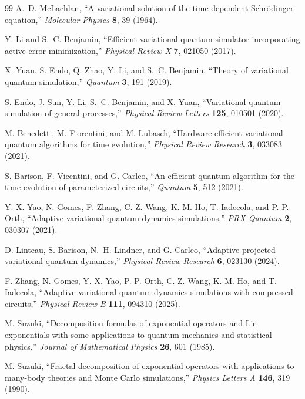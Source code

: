 \documentclass[
  reprint,
  amsmath,
  amssymb,
  aps,
  pra,
  nofootinbib,
  superscriptaddress,
  floatfix
]{revtex4-2}
\begin{document}
\begin{thebibliography}{99}
A.~D. McLachlan,
``A variational solution of the time-dependent Schr\"odinger equation,''
\emph{Molecular Physics} \textbf{8}, 39 (1964).

Y. Li and S.~C. Benjamin,
``Efficient variational quantum simulator incorporating active error minimization,''
\emph{Physical Review X} \textbf{7}, 021050 (2017).

X. Yuan, S. Endo, Q. Zhao, Y. Li, and S.~C. Benjamin,
``Theory of variational quantum simulation,''
\emph{Quantum} \textbf{3}, 191 (2019).

S. Endo, J. Sun, Y. Li, S.~C. Benjamin, and X. Yuan,
``Variational quantum simulation of general processes,''
\emph{Physical Review Letters} \textbf{125}, 010501 (2020).

M. Benedetti, M. Fiorentini, and M. Lubasch,
``Hardware-efficient variational quantum algorithms for time evolution,''
\emph{Physical Review Research} \textbf{3}, 033083 (2021).

S. Barison, F. Vicentini, and G. Carleo,
``An efficient quantum algorithm for the time evolution of parameterized circuits,''
\emph{Quantum} \textbf{5}, 512 (2021).

Y.-X. Yao, N. Gomes, F. Zhang, C.-Z. Wang, K.-M. Ho, T. Iadecola, and P. P. Orth,
``Adaptive variational quantum dynamics simulations,''
\emph{PRX Quantum} \textbf{2}, 030307 (2021).

D. Linteau, S. Barison, N.~H. Lindner, and G. Carleo,
``Adaptive projected variational quantum dynamics,''
\emph{Physical Review Research} \textbf{6}, 023130 (2024).

F. Zhang, N. Gomes, Y.-X. Yao, P. P. Orth, C.-Z. Wang, K.-M. Ho, and T. Iadecola,
``Adaptive variational quantum dynamics simulations with compressed circuits,''
\emph{Physical Review B} \textbf{111}, 094310 (2025).

M. Suzuki,
``Decomposition formulas of exponential operators and Lie exponentials with some applications to quantum mechanics and statistical physics,''
\emph{Journal of Mathematical Physics} \textbf{26}, 601 (1985).

M. Suzuki,
``Fractal decomposition of exponential operators with applications to many-body theories and Monte Carlo simulations,''
\emph{Physics Letters A} \textbf{146}, 319 (1990).


\end{thebibliography}
\end{document}
